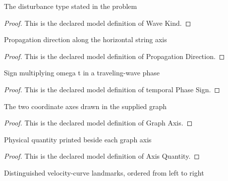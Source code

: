 \begin{definition}
  \label{def:physics:phyx-mini-0305:phyxminiproblems-problemphyxmini0305-wavekind}
  The disturbance type stated in the problem
\end{definition}
\begin{proof}
  This is the declared model definition of Wave Kind.
\end{proof}
\begin{definition}
  \label{def:physics:phyx-mini-0305:phyxminiproblems-problemphyxmini0305-propagationdirection}
  Propagation direction along the horizontal string axis
\end{definition}
\begin{proof}
  This is the declared model definition of Propagation Direction.
\end{proof}
\begin{definition}
  \label{def:physics:phyx-mini-0305:phyxminiproblems-problemphyxmini0305-temporalphasesign}
  Sign multiplying omega t in a traveling-wave phase
\end{definition}
\begin{proof}
  This is the declared model definition of temporal Phase Sign.
\end{proof}
\begin{definition}
  \label{def:physics:phyx-mini-0305:phyxminiproblems-problemphyxmini0305-graphaxis}
  The two coordinate axes drawn in the supplied graph
\end{definition}
\begin{proof}
  This is the declared model definition of Graph Axis.
\end{proof}
\begin{definition}
  \label{def:physics:phyx-mini-0305:phyxminiproblems-problemphyxmini0305-axisquantity}
  Physical quantity printed beside each graph axis
\end{definition}
\begin{proof}
  This is the declared model definition of Axis Quantity.
\end{proof}
\begin{definition}
  \label{def:physics:phyx-mini-0305:phyxminiproblems-problemphyxmini0305-velocitygraphlandmark}
  Distinguished velocity-curve landmarks, ordered from left to right
\end{definition}
